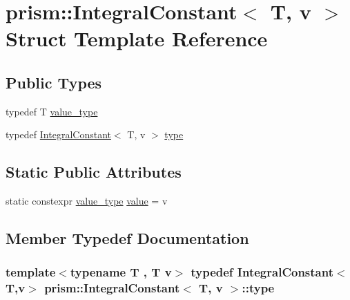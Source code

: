 \hypertarget{structprism_1_1_integral_constant}{}\section{prism\+:\+:Integral\+Constant$<$ T, v $>$ Struct Template Reference}
\label{structprism_1_1_integral_constant}
\subsection*{Public Types}
\begin{DoxyCompactItemize}
\item 
typedef T \hyperlink{structprism_1_1_integral_constant_a95bc5b7fb717309af29af2c13f06ffe2}{value\+\_\+type}
\item 
typedef \hyperlink{structprism_1_1_integral_constant}{Integral\+Constant}$<$ T, v $>$ \hyperlink{structprism_1_1_integral_constant_a81f823c47213b220608c2d3475c0947b}{type}
\end{DoxyCompactItemize}
\subsection*{Static Public Attributes}
\begin{DoxyCompactItemize}
\item 
static constexpr \hyperlink{structprism_1_1_integral_constant_a95bc5b7fb717309af29af2c13f06ffe2}{value\+\_\+type} \hyperlink{structprism_1_1_integral_constant_ace2611e15a2d8b14e8f47beb9cbde3a2}{value} = v
\end{DoxyCompactItemize}


\subsection{Member Typedef Documentation}
\subsubsection[{\texorpdfstring{type}{type}}]{\setlength{\rightskip}{0pt plus 5cm}template$<$typename T , T v$>$ typedef {\bf Integral\+Constant}$<$T,v$>$ {\bf prism\+::\+Integral\+Constant}$<$ T, v $>$\+::{\bf type}}\hypertarget{structprism_1_1_integral_constant_a81f823c47213b220608c2d3475c0947b}{}\label{structprism_1_1_integral_constant_a81f823c47213b220608c2d3475c0947b}
